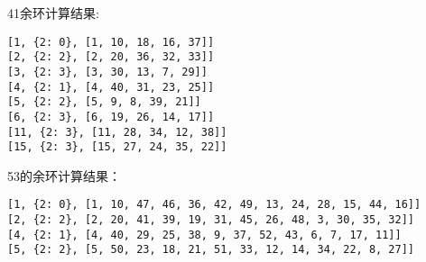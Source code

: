 \documentclass{article}
\begin{document}
 41余环计算结果:
\begin{verbatim}
[1, {2: 0}, [1, 10, 18, 16, 37]]  
[2, {2: 2}, [2, 20, 36, 32, 33]]  
[3, {2: 3}, [3, 30, 13, 7, 29]]  
[4, {2: 1}, [4, 40, 31, 23, 25]]  
[5, {2: 2}, [5, 9, 8, 39, 21]]  
[6, {2: 3}, [6, 19, 26, 14, 17]]  
[11, {2: 3}, [11, 28, 34, 12, 38]]  
[15, {2: 3}, [15, 27, 24, 35, 22]]  
\end{verbatim}

53的余环计算结果：
\begin{verbatim}
[1, {2: 0}, [1, 10, 47, 46, 36, 42, 49, 13, 24, 28, 15, 44, 16]]
[2, {2: 2}, [2, 20, 41, 39, 19, 31, 45, 26, 48, 3, 30, 35, 32]]
[4, {2: 1}, [4, 40, 29, 25, 38, 9, 37, 52, 43, 6, 7, 17, 11]]
[5, {2: 2}, [5, 50, 23, 18, 21, 51, 33, 12, 14, 34, 22, 8, 27]]
\end{verbatim}
\end{document}
